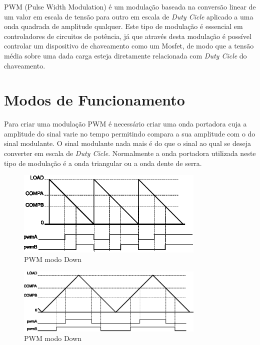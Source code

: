 PWM (Pulse Width Modulation) é um modulação baseada na conversão linear de um valor em escala de tensão para outro em escala de \emph{Duty Cicle} aplicado a uma onda quadrada de amplitude qualquer. Este tipo de modulação é essencial em controladores de circuitos de potência, já que através desta modulação é possível controlar um dispositivo de chaveamento como um Mosfet,  de modo que a tensão média sobre uma dada carga esteja diretamente relacionada com \emph{Duty Cicle} do chaveamento.  

\section{Modos de Funcionamento}

Para criar uma modulação PWM é necessário criar uma onda portadora cuja a amplitude do sinal varie no tempo permitindo compara a sua amplitude com o do sinal modulante. O sinal modulante nada mais é do que o sinal ao qual se deseja converter em escala de \emph{Duty Cicle}. Normalmente a onda portadora utilizada neste tipo de modulação é a onda triangular ou a onda dente de serra.  

\begin{figure}[H]
	\centering
\includegraphics[width=0.8\textwidth] {figuras/Down.eps}
	\caption{PWM modo Down \cite{DATASHEET_TIVA}}
	\label{fig:Down}
\end{figure}

\begin{figure}[H]
	\centering
	\includegraphics[width=0.8\textwidth] {figuras/UpDown.eps}
	\caption{PWM modo Down \cite{DATASHEET_TIVA}}
	\label{fig:UpDown}
\end{figure}

